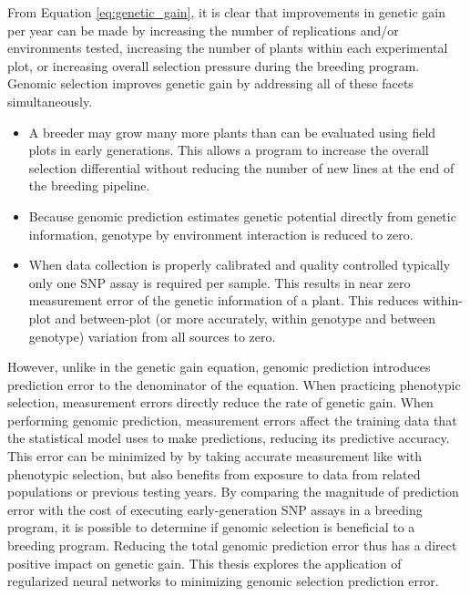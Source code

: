 From Equation \ref{eq:genetic_gain}, it is clear that improvements in genetic gain per year can
be made by increasing the number of replications and/or environments tested, increasing the 
number of plants within each experimental plot, or increasing overall selection pressure 
during the breeding program. Genomic selection improves genetic gain by addressing 
all of these facets simultaneously.

\begin{itemize}
    \item A breeder may grow many more plants than can be evaluated using field plots in 
          early generations. This allows a program to increase the overall selection 
          differential without reducing the number of new lines at the end of the breeding pipeline.
    \item Because genomic prediction estimates genetic potential directly from genetic information,
          genotype by environment interaction is reduced to zero.
    \item When data collection is properly calibrated and quality controlled typically only one
          SNP assay is required per sample. This results in near zero measurement error of the 
          genetic information of a plant. This reduces within-plot and between-plot 
          (or more accurately, within genotype and between genotype) variation from all sources to zero.
\end{itemize}

However, unlike in the genetic gain equation, genomic prediction introduces prediction error to 
the denominator of the equation. When practicing phenotypic selection, measurement errors 
directly reduce the rate of genetic gain. When performing genomic prediction, measurement errors 
affect the training data that the statistical model uses to make predictions, reducing its predictive 
accuracy. This error can be minimized by by taking accurate measurement like with phenotypic selection, 
but also benefits from exposure to data from related populations or previous testing years. 
By comparing the magnitude of prediction error with the cost of executing early-generation 
SNP assays in a breeding program, it is possible to determine if genomic selection is 
beneficial to a breeding program. Reducing the total genomic prediction error thus has a 
direct positive impact on genetic gain. This thesis explores the application of regularized 
neural networks to minimizing genomic selection prediction error.


